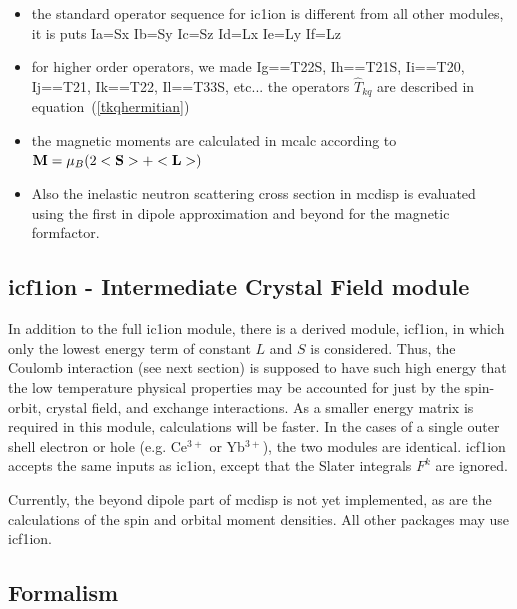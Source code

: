 \begin{itemize}
\item the standard operator sequence for ic1ion is different from all other modules, it is
puts Ia=Sx Ib=Sy Ic=Sz Id=Lx Ie=Ly If=Lz
\item for higher order operators, we made Ig==T22S, Ih==T21S, Ii==T20, Ij==T21, Ik==T22,
Il==T33S, etc... the operators $\hat T_{kq}$ are described in equation~(\ref{tkqhermitian})
\item the magnetic moments are calculated in mcalc according 
to $\mathbf M=\mu_B(2<\mathbf S>+<\mathbf L>)$
\item Also the inelastic neutron scattering cross section
 in {\prg mcdisp} is evaluated using the first
  in dipole approximation and beyond for the magnetic formfactor.
\end{itemize}

\subsection{{\prg icf1ion} - Intermediate Crystal Field module}

In addition to the full {\prg ic1ion} module, there is a derived module, {\prg icf1ion}, in which only the lowest
energy term of constant $L$ and $S$ is considered. Thus, the Coulomb interaction (see next section) is supposed
to have such high energy that the low temperature physical properties may be accounted for just by the spin-orbit,
crystal field, and exchange interactions. As a smaller energy matrix is required in this module, calculations will
be faster. In the cases of a single outer shell electron or hole (e.g. Ce$^{3+}$ or Yb$^{3+}$), the two modules are 
identical. {\prg icf1ion} accepts the same inputs as {\prg ic1ion}, except that the Slater integrals $F^k$ are 
ignored. 

Currently, the beyond dipole part of {\prg mcdisp} is not yet implemented, as are the calculations
of the spin and orbital moment densities. All other packages may use {\prg icf1ion}.

\subsection{Formalism}

